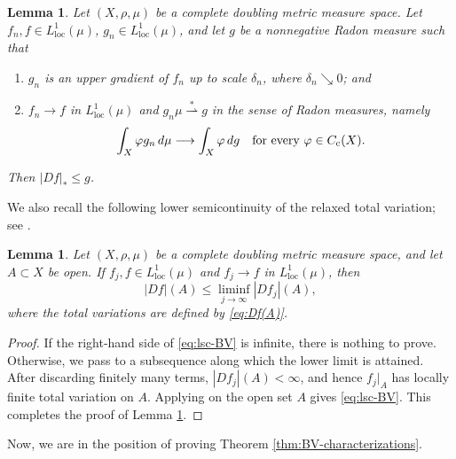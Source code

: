 \documentclass[11pt]{amsart}
\newtheorem{lemma}[theorem]{Lemma}
\theoremstyle{definition}
\theoremstyle{remark}
\numberwithin{equation}{section}
\begin{document}
\begin{lemma}\label{prop:semics}
Let $(X,\rho,\mu)$ be a complete doubling metric measure space.
Let $f_n,f\in L^1_{\mathrm{loc}}(\mu)$, $g_n\in L^1_{\mathrm{loc}}(\mu)$, and let
$g$ be a nonnegative Radon measure such that
\begin{enumerate}[\rm(i)]
  \item $g_n$ is an upper gradient of $f_n$ up to scale $\delta_n$, where $\delta_n\searrow
  0$; and
  \item $f_n\to f$ in $L^1_{\mathrm{loc}}(\mu)$ and
  $g_n\mu\overset{*}{\rightharpoonup}g$ in the sense of Radon measures, namely
  $$
  \int_X\varphi g_n\,d\mu\longrightarrow\int_X\varphi\,dg
  \quad\text{for every }\varphi\in C_{\rm c}(X).
  $$
\end{enumerate}
Then $|Df|_*\le g$.
\end{lemma}
We also recall the following lower semicontinuity of the relaxed total
variation; see \cite[Proposition 3.6]{M:03}.
\begin{lemma}\label{lem:lsc}
Let $(X,\rho,\mu)$ be a complete doubling metric measure space, and let
$A\subset X$ be open. If $f_j,f\in L^1_{\mathrm{loc}}(\mu)$ and
$f_j\to f$ in $L^1_{\mathrm{loc}}(\mu)$, then
\begin{equation}\label{eq:lsc-BV}
  |Df|(A)\leq \liminf_{j\to\infty}|Df_j|(A),
\end{equation}
where the total variations are defined by \eqref{eq:Df(A)}.
\end{lemma}

\begin{proof}
If the right-hand side of \eqref{eq:lsc-BV} is infinite, there is nothing
to prove. Otherwise, we pass to a subsequence along which the lower limit is
attained. After discarding finitely many terms, $|Df_j|(A)<\infty$, and
hence $f_j|_A$ has locally finite total variation on $A$. Applying
\cite[Proposition 3.6]{M:03} on the open set $A$ gives
\eqref{eq:lsc-BV}.
This completes the proof of Lemma \ref{lem:lsc}.
\end{proof}

Now, we are in the position of proving Theorem \ref{thm:BV-characterizations}.
\end{document}
